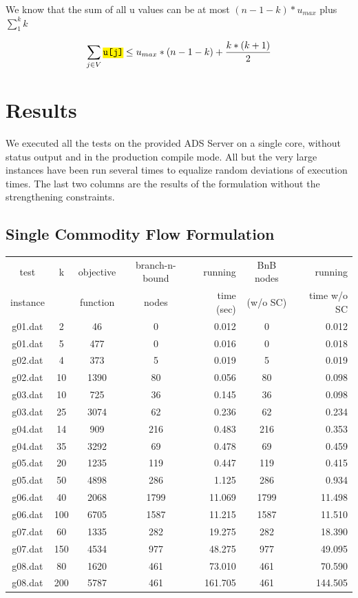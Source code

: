 \documentclass[,%
			paper=a4,%
			DIV14,
			liststotoc,
			bibtotoc,
			draft=false,%
			numbers=noendperiod
			]{scrartcl}
\newcommand{\ilc}[1]{\hl{\texttt{#1}}} %
\newcommand{\vertex}{j}
\begin{document}
We know that the sum of all u values can be at most $(n-1 - k) * u_{max}$ plus $\sum_1^k{k}$

\begin{equation}\label{eq:mztMaxU}
	\sum_{\vertex \in V}{\ilc{u[\vertex]}} \leq u_{max} * ( n - 1 - k ) + \frac{k * (k+1)}{2}
\end{equation}


\section{Results}
We executed all the tests on the provided ADS Server on a single core, without status output and in the production compile mode. All but the very large instances have been run several times to equalize random deviations of execution times. The last two columns are the results of the formulation without the strengthening constraints.


\subsection{Single Commodity Flow Formulation}

\begin{tabular}{||c||cccr|cr||}

\hline
test     & k & objective  & branch-n-bound & running   & BnB nodes & running\\
instance &   & function   & nodes          & time (sec)& (w/o SC)  & time w/o SC \\
\hline

g01.dat	&	2	&	46	&	0	&	0.012	&	0	&	0.012	\\
g01.dat	&	5	&	477	&	0	&	0.016	&	0	&	0.018	\\
g02.dat	&	4	&	373	&	5	&	0.019	&	5	&	0.019	\\
g02.dat	&	10	&	1390	&	80	&	0.056	&	80	&	0.098	\\
g03.dat	&	10	&	725	&	36	&	0.145	&	36	&	0.098	\\
g03.dat	&	25	&	3074	&	62	&	0.236	&	62	&	0.234	\\
g04.dat	&	14	&	909	&	216	&	0.483	&	216	&	0.353	\\
g04.dat	&	35	&	3292	&	69	&	0.478	&	69	&	0.459	\\
g05.dat	&	20	&	1235	&	119	&	0.447	&	119	&	0.415	\\
g05.dat	&	50	&	4898	&	286	&	1.125	&	286	&	0.934	\\
g06.dat	&	40	&	2068	&	1799	&	11.069	&	1799	&	11.498	\\
g06.dat	&	100	&	6705	&	1587	&	11.215	&	1587	&	11.510	\\
g07.dat	&	60	&	1335	&	282	&	19.275	&	282	&	18.390	\\
g07.dat	&	150	&	4534	&	977	&	48.275	&	977	&	49.095	\\
g08.dat	&	80	&	1620	&	461	&	73.010	&	461	&	70.590	\\
g08.dat	&	200	&	5787	&	461	&	161.705	&	461	&	144.505	\\

\hline

\end{tabular}
\end{document}
